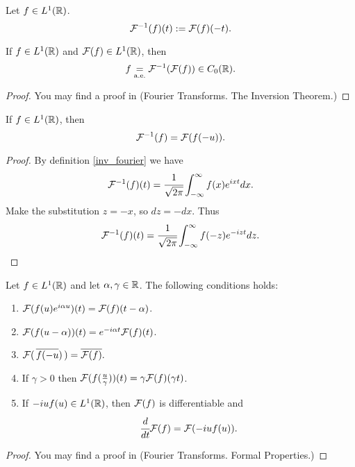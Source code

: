 \documentclass[main.tex]{subfiles}
\begin{document}
\begin{definition}
\label{inv_fourier}
Let $f\in L^1(\mathbb{R})$.
\begin{equation}
    \mathcal{F}^{-1}(f)(t) := \mathcal{F}(f)(-t). 
\end{equation}
\end{definition}

\begin{theorem}
If $f\in L^1(\mathbb{R})$ and $\mathcal{F}(f)\in L^1(\mathbb{R})$, then
\begin{equation}
    f \underset{\text{a.e.}}{=} \mathcal{F}^{-1}(\mathcal{F}(f)) \in C_0(\mathbb{R}).
\end{equation} 
\end{theorem}
\begin{proof}
You may find a proof in \cite{rudin1987} (Fourier Transforms. The Inversion Theorem.)
\end{proof}

\begin{theorem}
If $f\in L^1(\mathbb{R})$, then
\begin{equation}
    \mathcal{F}^{-1}(f) = \mathcal{F}(f(-u)).
\end{equation}
\end{theorem}
\begin{proof}
By definition \ref{inv_fourier} we have
\begin{equation}
     \mathcal{F}^{-1}(f)(t) = \cfrac{1}{\sqrt{2\pi}}\int_{-\infty}^{\infty} f(x)e^{ixt}dx.
\end{equation}
Make the substitution $z = -x$, so $dz = -dx$. Thus
\begin{equation}
    \mathcal{F}^{-1}(f)(t) = \cfrac{1}{\sqrt{2\pi}}\int_{-\infty}^{\infty} f(-z)e^{-izt}dz.
\end{equation}
\end{proof}

\begin{theorem}
\label{fourier_formal}
Let $f\in L^1(\mathbb{R})$ and let $\alpha, \gamma\in\mathbb{R}$. The following conditions holds:
\begin{enumerate}
\item
$\mathcal{F}(f(u)e^{i\alpha u})(t) = \mathcal{F}(f)(t - \alpha)$.
\item
$\mathcal{F}(f(u - \alpha))(t) =e^{-i\alpha t}\mathcal{F}(f)(t)$.
\item
$\mathcal{F}(\, \overline{f(-u}) \,) = \overline{\mathcal{F}(f)}.$    

\item
If $\gamma > 0$ then $\mathcal{F}({f(\frac{u}{\gamma})})(t) = \gamma \mathcal{F}(f)(\gamma t)$.

\item
If $-iuf(u)\in L^1(\mathbb{R})$, then $\mathcal{F}(f)$ is differentiable and
\begin{equation}
    \cfrac{d}{dt}\mathcal{F}(f) = \mathcal{F}(-iuf(u)).
\end{equation}
\end{enumerate}
\end{theorem}
\begin{proof}
You may find a proof in \cite{rudin1987} (Fourier Transforms. Formal Properties.)
\end{proof}
\end{document}
